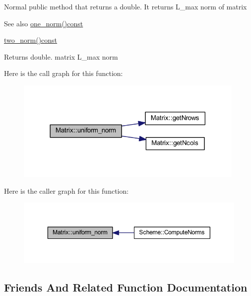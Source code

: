 Normal public method that returns a double. It returns L\+\_\+max norm of matrix \begin{DoxySeeAlso}{See also}
\mbox{\hyperlink{class_matrix_af4d468252f3ecbbcaa5726c76e332b4c}{one\+\_\+norm()const}} 

\mbox{\hyperlink{class_matrix_aac496af05ec7aa26afc2b9c6d0ab8b66}{two\+\_\+norm()const}} 
\end{DoxySeeAlso}
\begin{DoxyReturn}{Returns}
double. matrix L\+\_\+max norm 
\end{DoxyReturn}
Here is the call graph for this function\+:
\nopagebreak
\begin{figure}[H]
\begin{center}
\leavevmode
\includegraphics[width=314pt]{class_matrix_a43066c7fe6418aad40170b85415063e8_cgraph}
\end{center}
\end{figure}
Here is the caller graph for this function\+:
\nopagebreak
\begin{figure}[H]
\begin{center}
\leavevmode
\includegraphics[width=350pt]{class_matrix_a43066c7fe6418aad40170b85415063e8_icgraph}
\end{center}
\end{figure}


\subsection{Friends And Related Function Documentation}
\mbox{\label{class_matrix_a5ed9a90fd6f010e7e9840a17d92d5361}} 
